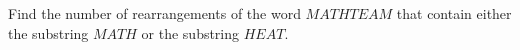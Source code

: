 Find the number of rearrangements of the word $MATHTEAM$ that contain either the substring $MATH$ or the substring $HEAT$.

